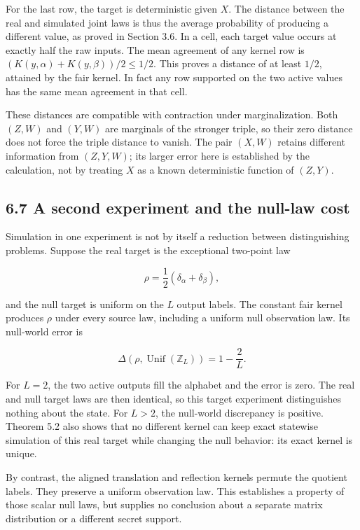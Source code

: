 \documentclass[
]{article}
\begin{document}
For the last row, the target is deterministic given \(X\). The distance
between the real and simulated joint laws is thus the average
probability of producing a different value, as proved in Section 3.6. In
a cell, each target value occurs at exactly half the raw inputs. The
mean agreement of any kernel row is
\((K(y,\alpha)+K(y,\beta))/2\le1/2\). This proves a distance of at least
\(1/2\), attained by the fair kernel. In fact any row supported on the
two active values has the same mean agreement in that cell.

These distances are compatible with contraction under marginalization.
Both \((Z,W)\) and \((Y,W)\) are marginals of the stronger triple, so
their zero distance does not force the triple distance to vanish. The
pair \((X,W)\) retains different information from \((Z,Y,W)\); its
larger error here is established by the calculation, not by treating
\(X\) as a known deterministic function of \((Z,Y)\).

\subsection{6.7 A second experiment and the null-law
cost}\label{a-second-experiment-and-the-null-law-cost}

Simulation in one experiment is not by itself a reduction between
distinguishing problems. Suppose the real target is the exceptional
two-point law

\[
\rho=\frac12(\delta_\alpha+\delta_\beta),
\]

and the null target is uniform on the \(L\) output labels. The constant
fair kernel produces \(\rho\) under every source law, including a
uniform null observation law. Its null-world error is

\[
\Delta(\rho,\operatorname{Unif}(\mathbb Z_L))=1-\frac2L.
\]

For \(L=2\), the two active outputs fill the alphabet and the error is
zero. The real and null target laws are then identical, so this target
experiment distinguishes nothing about the state. For \(L>2\), the
null-world discrepancy is positive. Theorem 5.2 also shows that no
different kernel can keep exact statewise simulation of this real target
while changing the null behavior: its exact kernel is unique.

By contrast, the aligned translation and reflection kernels permute the
quotient labels. They preserve a uniform observation law. This
establishes a property of those scalar null laws, but supplies no
conclusion about a separate matrix distribution or a different secret
support.
\end{document}
